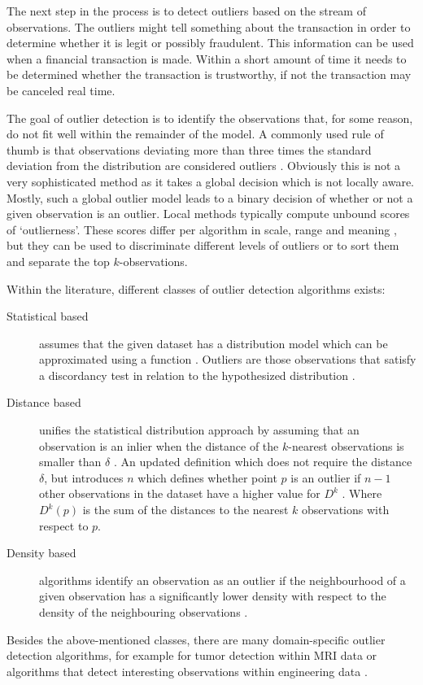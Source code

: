 The next step in the process is to detect outliers based on the stream of observations. The outliers might tell something about the transaction in order to determine whether it is legit or possibly fraudulent. This information can be used when a financial transaction is made. Within a short amount of time it needs to be determined whether the transaction is trustworthy, if not the transaction may be canceled real time.

The goal of outlier detection is to identify the observations that, for some reason, do not fit well within the remainder of the model. A commonly used rule of thumb is that observations deviating more than three times the standard deviation from the distribution are considered outliers \cite{9783540262565}. Obviously this is not a very sophisticated method as it takes a global decision which is not locally aware. Mostly, such a global outlier model leads to a binary decision of whether or not a given observation is an outlier. Local methods typically compute unbound scores of `outlierness'. These scores differ per algorithm in scale, range and meaning \cite{4053049}, but they can be used to discriminate different levels of outliers or to sort them and separate the top $k$-observations.

Within the literature, different classes of outlier detection algorithms exists:
\begin{description}
 \item[Statistical based] assumes that the given dataset has a distribution model which can be approximated using a function \cite{Hadi2009}. Outliers are those observations that satisfy a discordancy test in relation to the hypothesized distribution \cite{barnett1994outliers}. 
 \item[Distance based] unifies the statistical distribution approach \cite{Knorr:1997:UAM:782010.782021} by assuming that an observation is an inlier when the distance of the $k$-nearest observations is smaller than $\delta$ \cite{Knorr98algorithmsfor}. An updated definition which does not require the distance $\delta$, but introduces $n$ which defines whether point $p$ is an outlier if $n-1$ other observations in the dataset have a higher value for $D^{k}$ \cite{Ramaswamy:2000:EAM:335191.335437}. Where $D^{k}(p)$ is the sum of the distances to the nearest $k$ observations with respect to $p$.
 \item[Density based] algorithms identify an observation as an outlier if the neighbourhood of a given observation has a significantly lower density with respect to the density of the neighbouring observations \cite{Breunig:2000:LID:335191.335388,Breunig:2000:LID:342009.335388}.
\end{description}
Besides the above-mentioned classes, there are many domain-specific outlier detection algorithms, for example for tumor detection within MRI data \cite{991693} or algorithms that detect interesting observations within engineering data \cite{rog}.

